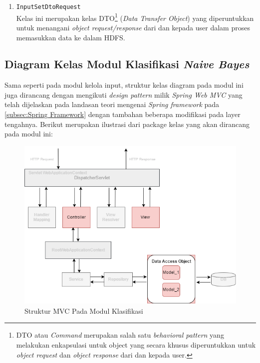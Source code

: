 \begin{enumerate}
\begin{enumerate}
		\end{enumerate}
		
	
	
	\item \texttt{InputSetDtoRequest}\\
	Kelas ini merupakan kelas DTO\footnote{DTO atau \textit{Command} merupakan salah satu \textit{behavioral pattern} yang melakukan enkapsulasi untuk object yang secara khusus diperuntukkan untuk \textit{object request} dan \textit{object response} dari dan kepada user.} (\textit{Data Transfer Object}) yang diperuntukkan untuk menangani \textit{object request/response} dari dan kepada user dalam proses memasukkan data ke dalam HDFS.


\end{enumerate}

\subsection{Diagram Kelas Modul Klasifikasi \textit{Naive Bayes}}

Sama seperti pada modul kelola input, struktur kelas diagram pada modul ini juga dirancang dengan mengikuti \textit{design pattern} milik \textit{Spring Web MVC} yang telah dijelaskan pada landasan teori mengenai \textit{Spring framework} pada \ref{subsec:Spring Framework} dengan tambahan beberapa modifikasi pada layer tengahnya. Berikut merupakan ilustrasi dari package kelas yang akan dirancang pada modul ini:
\begin{figure}[H]
	\centering
	\includegraphics[scale=0.7]{ClassDiagramLengkap/springmvc_rev1}
	\caption[Struktur MVC Pada Modul Klasifikasi]{Struktur MVC Pada Modul Klasifikasi}
	\label{fig:Struktur MVC Pada Modul Klasifikasi}
\end{figure}

